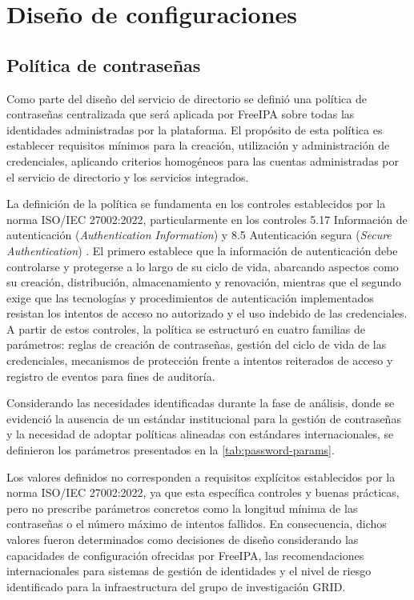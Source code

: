 \section{Diseño de configuraciones}\label{sec:diseno-configuraciones}

\subsection{Política de contraseñas}

Como parte del diseño del servicio de directorio se definió una política de contraseñas centralizada que será aplicada por FreeIPA sobre todas las identidades administradas por la plataforma. El propósito de esta política es establecer requisitos mínimos para la creación, utilización y administración de credenciales, aplicando criterios homogéneos para las cuentas administradas por el servicio de directorio y los servicios integrados.

La definición de la política se fundamenta en los controles establecidos por la norma ISO/IEC 27002:2022, particularmente en los controles 5.17 Información de autenticación (\textit{Authentication Information}) y 8.5 Autenticación segura (\textit{Secure Authentication}) \citep{ISO27002}. El primero establece que la información de autenticación debe controlarse y protegerse a lo largo de su ciclo de vida, abarcando aspectos como su creación, distribución, almacenamiento y renovación, mientras que el segundo exige que las tecnologías y procedimientos de autenticación implementados resistan los intentos de acceso no autorizado y el uso indebido de las credenciales. A partir de estos controles, la política se estructuró en cuatro familias de parámetros: reglas de creación de contraseñas, gestión del ciclo de vida de las credenciales, mecanismos de protección frente a intentos reiterados de acceso y registro de eventos para fines de auditoría.

Considerando las necesidades identificadas durante la fase de análisis, donde se evidenció la ausencia de un estándar institucional para la gestión de contraseñas y la necesidad de adoptar políticas alineadas con estándares internacionales, se definieron los parámetros presentados en la \autoref{tab:password-params}.



Los valores definidos no corresponden a requisitos explícitos establecidos por la norma ISO/IEC 27002:2022, ya que esta específica controles y buenas prácticas, pero no prescribe parámetros concretos como la longitud mínima de las contraseñas o el número máximo de intentos fallidos. En consecuencia, dichos valores fueron determinados como decisiones de diseño considerando las capacidades de configuración ofrecidas por FreeIPA, las recomendaciones internacionales para sistemas de gestión de identidades y el nivel de riesgo identificado para la infraestructura del grupo de investigación \ac{GRID}.

